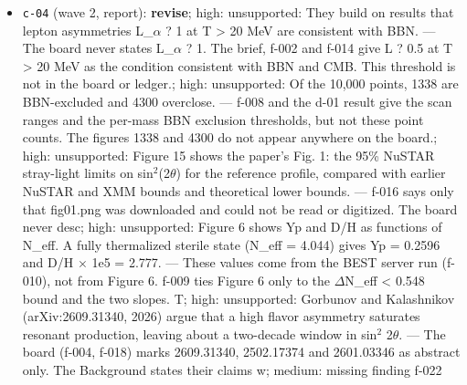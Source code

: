 \documentclass[11pt,a4paper]{article}
\begin{document}
\begin{itemize}
  \item \texttt{c-04} (wave 2, report): \textbf{revise}; high: unsupported: They build on results that lepton asymmetries L\_$\alpha$ ? 1 at T \textgreater{} 20 MeV are consistent with BBN. --- The board never states L\_$\alpha$ ? 1. The brief, f-002 and f-014 give L ? 0.5 at T \textgreater{} 20 MeV as the condition consistent with BBN and CMB. This threshold is not in the board or ledger.; high: unsupported: Of the 10,000 points, 1338 are BBN-excluded and 4300 overclose. --- f-008 and the d-01 result give the scan ranges and the per-mass BBN exclusion thresholds, but not these point counts. The figures 1338 and 4300 do not appear anywhere on the board.; high: unsupported: Figure 15 shows the paper's Fig. 1: the 95\% NuSTAR stray-light limits on sin$^2$(2$\theta$) for the reference profile, compared with earlier NuSTAR and XMM bounds and theoretical lower bounds. --- f-016 says only that fig01.png was downloaded and could not be read or digitized. The board never desc; high: unsupported: Figure 6 shows Yp and D/H as functions of N\_eff. A fully thermalized sterile state (N\_eff = 4.044) gives Yp = 0.2596 and D/H $\times$ 1e5 = 2.777. --- These values come from the BEST server run (f-010), not from Figure 6. f-009 ties Figure 6 only to the $\Delta$N\_eff \textless{} 0.548 bound and the two slopes. T; high: unsupported: Gorbunov and Kalashnikov (arXiv:2609.31340, 2026) argue that a high flavor asymmetry saturates resonant production, leaving about a two-decade window in sin$^2$ 2$\theta$. --- The board (f-004, f-018) marks 2609.31340, 2502.17374 and 2601.03346 as abstract only. The Background states their claims w; medium: missing finding f-022
\end{itemize}
\end{document}
